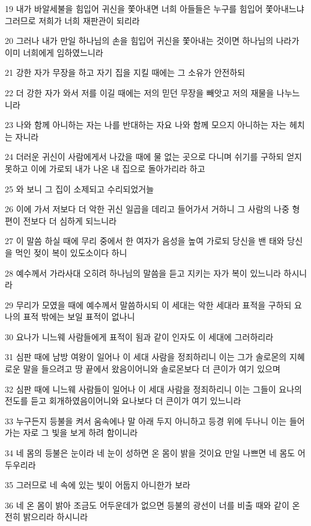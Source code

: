 \par 19 내가 바알세불을 힘입어 귀신을 쫓아내면 너희 아들들은 누구를 힘입어 쫓아내느냐 그러므로 저희가 너희 재판관이 되리라
\par 20 그러나 내가 만일 하나님의 손을 힘입어 귀신을 쫓아내는 것이면 하나님의 나라가 이미 너희에게 임하였느니라
\par 21 강한 자가 무장을 하고 자기 집을 지킬 때에는 그 소유가 안전하되
\par 22 더 강한 자가 와서 저를 이길 때에는 저의 믿던 무장을 빼앗고 저의 재물을 나누느니라
\par 23 나와 함께 아니하는 자는 나를 반대하는 자요 나와 함께 모으지 아니하는 자는 헤치는 자니라
\par 24 더러운 귀신이 사람에게서 나갔을 때에 물 없는 곳으로 다니며 쉬기를 구하되 얻지 못하고 이에 가로되 내가 나온 내 집으로 돌아가리라 하고
\par 25 와 보니 그 집이 소제되고 수리되었거늘
\par 26 이에 가서 저보다 더 악한 귀신 일곱을 데리고 들어가서 거하니 그 사람의 나중 형편이 전보다 더 심하게 되느니라
\par 27 이 말씀 하실 때에 무리 중에서 한 여자가 음성을 높여 가로되 당신을 밴 태와 당신을 먹인 젖이 복이 있도소이다 하니
\par 28 예수께서 가라사대 오히려 하나님의 말씀을 듣고 지키는 자가 복이 있느니라 하시니라
\par 29 무리가 모였을 때에 예수께서 말씀하시되 이 세대는 악한 세대라 표적을 구하되 요나의 표적 밖에는 보일 표적이 없나니
\par 30 요나가 니느웨 사람들에게 표적이 됨과 같이 인자도 이 세대에 그러하리라
\par 31 심판 때에 남방 여왕이 일어나 이 세대 사람을 정죄하리니 이는 그가 솔로몬의 지혜로운 말을 들으려고 땅 끝에서 왔음이어니와 솔로몬보다 더 큰이가 여기 있으며
\par 32 심판 때에 니느웨 사람들이 일어나 이 세대 사람을 정죄하리니 이는 그들이 요나의 전도를 듣고 회개하였음이어니와 요나보다 더 큰이가 여기 있느니라
\par 33 누구든지 등불을 켜서 움속에나 말 아래 두지 아니하고 등경 위에 두나니 이는 들어가는 자로 그 빛을 보게 하려 함이니라
\par 34 네 몸의 등불은 눈이라 네 눈이 성하면 온 몸이 밝을 것이요 만일 나쁘면 네 몸도 어두우리라
\par 35 그러므로 네 속에 있는 빛이 어둡지 아니한가 보라
\par 36 네 온 몸이 밝아 조금도 어두운데가 없으면 등불의 광선이 너를 비출 때와 같이 온전히 밝으리라 하시니라
